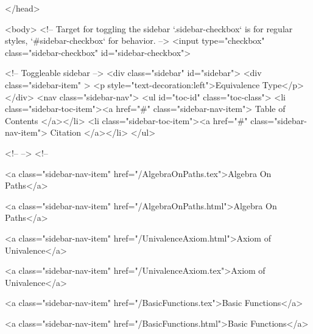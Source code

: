   
</head>




  <body>
    <!-- Target for toggling the sidebar `.sidebar-checkbox` is for regular
     styles, `#sidebar-checkbox` for behavior. -->
<input type="checkbox" class="sidebar-checkbox" id="sidebar-checkbox">

<!-- Toggleable sidebar -->
<div class="sidebar" id="sidebar">
  <div class="sidebar-item" >
    <p style="text-decoration:left">Equivalence Type</p>
  </div>
  <nav class="sidebar-nav">
    <ul id="toc-id" class="toc-class">
  <li class="sidebar-toc-item"><a href="#" class="sidebar-nav-item"> Table of Contents </a></li>
  <li class="sidebar-toc-item"><a href="#" class="sidebar-nav-item"> Citation </a></li>
</ul>


    <!--  -->
    <!-- 
      
    
      
    
      
    
      
        
      
    
      
        
          <a class="sidebar-nav-item" href="/AlgebraOnPaths.tex">Algebra On Paths</a>
        
      
    
      
        
          <a class="sidebar-nav-item" href="/AlgebraOnPaths.html">Algebra On Paths</a>
        
      
    
      
        
          <a class="sidebar-nav-item" href="/UnivalenceAxiom.html">Axiom of Univalence</a>
        
      
    
      
        
          <a class="sidebar-nav-item" href="/UnivalenceAxiom.tex">Axiom of Univalence</a>
        
      
    
      
        
          <a class="sidebar-nav-item" href="/BasicFunctions.tex">Basic Functions</a>
        
      
    
      
        
          <a class="sidebar-nav-item" href="/BasicFunctions.html">Basic Functions</a>
        
      
    
      
        
